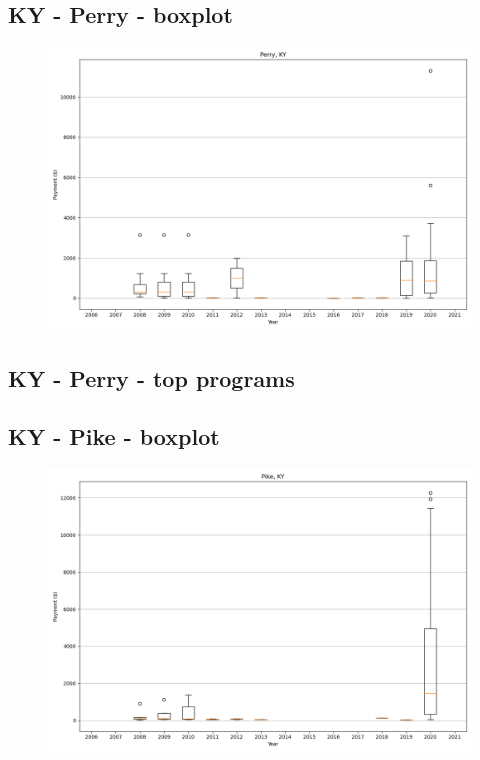 \subsection*{KY - Perry - boxplot}
\begin{figure}[h]
\centering
\includegraphics[width=7in]{../output/boxplots/counties/Perry-KY_boxplot.png}
\end{figure}


\subsection*{KY - Perry - top programs}

\newpage
\subsection*{KY - Pike - boxplot}
\begin{figure}[h]
\centering
\includegraphics[width=7in]{../output/boxplots/counties/Pike-KY_boxplot.png}
\end{figure}


